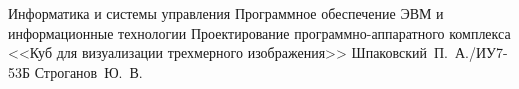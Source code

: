 \documentclass{bmstu}
\begin{document}
\renewcommand{\thelstlisting}{\arabic{lstlisting}}

\makecourseworktitle
    {Информатика и системы управления}
    {Программное обеспечение ЭВМ и информационные технологии}
    {Проектирование программно-аппаратного комплекса <<Куб для визуализации трехмерного изображения>>}
    {Шпаковский~П.~А./ИУ7-53Б}
    {Строганов~Ю.~В.}
    {}

\maketableofcontents








\makebibliography
\end{document}
